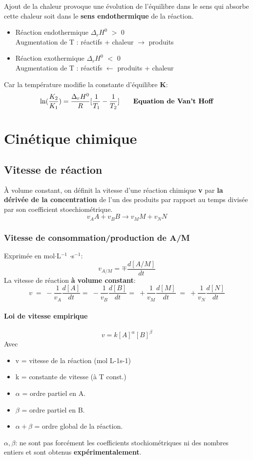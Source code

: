 \documentclass[10pt,a4paper]{book}
\begin{document}
Ajout de la chaleur provoque une évolution de l'équilibre dans le sens qui absorbe cette chaleur soit dans le \textbf{sens endothermique} de la réaction.
\begin{itemize}
\item Réaction endothermique $\Delta_rH^0$ $>$ 0 \\
Augmentation de T : réactifs + chaleur $\rightarrow$ produits
\item Réaction exothermique $\Delta_rH^0$ $<$ 0 \\
Augmentation de T : réactifs $\leftarrow$ produits + chaleur
\end{itemize} \par
Car la température modifie la constante d'équilibre \textbf{K}:
\[\ln(\frac{K_2}{K_1}) = \frac{\Delta_rH^0}{R}[\frac{1}{T_1}-\frac{1}{T_2}] \tag*{\textbf{Equation de Van't Hoff}}\]

\chapter{Cinétique chimique}

\section{Vitesse de réaction}
À volume constant, on définit la vitesse d'une réaction chimique \textbf{v} par \textbf{la dérivée de la concentration} de l'un des produits par rapport au temps divisée par son coefficient stoechiométrique.
\[v_AA + v_BB \longrightarrow v_MM + v_NN\]

\subsection{Vitesse de consommation/production de A/M}

Exprimée en mol$\cdot$L$^{-1}$ $\cdot$s$^{-1}$:
\[v_{A/M} = \mp \frac{d[A/M]}{dt}\]
La vitesse de réaction \textbf{à volume constant}:
\[v \; = \; -\frac{1}{v_A}\frac{d[A]}{dt} =\; -\frac{1}{v_B}\frac{d[B]}{dt} = \; +\frac{1}{v_M}\frac{d[M]}{dt} \; = \; +\frac{1}{v_N}\frac{d[N]}{dt}\] 

\subsubsection{Loi de vitesse empirique}

\[v = k[A]^{\alpha}[B]^{\beta}\]
Avec
\begin{itemize}
\item v = vitesse de la réaction (mol L-1s-1)
\item k = constante de vitesse (à T const.)
\item $\alpha$ = ordre partiel en A.
\item $\beta$ = ordre partiel en B.
\item \(\alpha + \beta\) = ordre global de la réaction.
\end{itemize}
\(\alpha, \beta\): ne sont pas forcément les coefficients stochiométriques ni des nombres entiers et sont obtenus \textbf{expérimentalement}.
\end{document}
